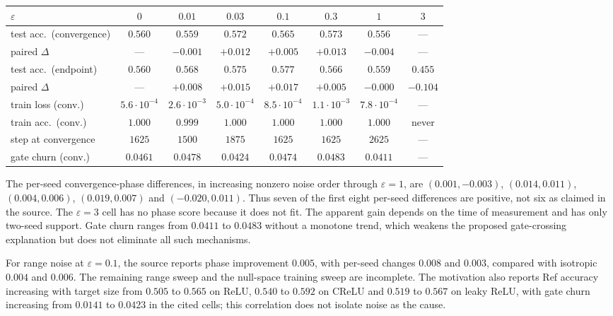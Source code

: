 \documentclass{article}
\theoremstyle{definition}
\theoremstyle{remark}
\begin{document}
\begin{center}\small
\begin{adjustbox}{max width=\linewidth}
\begin{tabular}{lccccccc}
\toprule
$\varepsilon$ & $0$ & $0.01$ & $0.03$ & $0.1$ & $0.3$ & $1$ & $3$ \\
\midrule
test acc.\ (convergence)  & $0.560$ & $0.559$ & $\mathbf{0.572}$ & $0.565$ & $\mathbf{0.573}$ & $0.556$ & --- \\
paired $\Delta$           & ---     & $-0.001$ & $+0.012$ & $+0.005$ & $+0.013$ & $-0.004$ & --- \\
\midrule
test acc.\ (endpoint)     & $0.560$ & $0.568$ & $0.575$ & $\mathbf{0.577}$ & $0.566$ & $0.559$ & $0.455$ \\
paired $\Delta$           & ---     & $+0.008$ & $+0.015$ & $\mathbf{+0.017}$ & $+0.005$ & $-0.000$ & $-0.104$ \\
\midrule
train loss (conv.)        & $5.6\cdot10^{-4}$ & $2.6\cdot10^{-3}$ & $5.0\cdot10^{-4}$
                          & $8.5\cdot10^{-4}$ & $1.1\cdot10^{-3}$ & $7.8\cdot10^{-4}$ & --- \\
train acc.\ (conv.)       & $1.000$ & $0.999$ & $1.000$ & $1.000$ & $1.000$ & $1.000$ & never \\
step at convergence       & $1625$ & $1500$ & $1875$ & $1625$ & $1625$ & $2625$ & --- \\
gate churn (conv.)        & $0.0461$ & $0.0478$ & $0.0424$ & $0.0474$ & $0.0483$ & $0.0411$ & --- \\
\bottomrule
\end{tabular}
\end{adjustbox}
\end{center}

The per-seed convergence-phase differences, in increasing nonzero noise order through $\varepsilon=1$, are $(0.001,-0.003)$, $(0.014,0.011)$, $(0.004,0.006)$, $(0.019,0.007)$ and $(-0.020,0.011)$. Thus seven of the first eight per-seed differences are positive, not six as claimed in the source. The $\varepsilon=3$ cell has no phase score because it does not fit. The apparent gain depends on the time of measurement and has only two-seed support. Gate churn ranges from $0.0411$ to $0.0483$ without a monotone trend, which weakens the proposed gate-crossing explanation but does not eliminate all such mechanisms.

For range noise at $\varepsilon=0.1$, the source reports phase improvement $0.005$, with per-seed changes $0.008$ and $0.003$, compared with isotropic $0.004$ and $0.006$. The remaining range sweep and the null-space training sweep are incomplete. The motivation also reports Ref accuracy increasing with target size from $0.505$ to $0.565$ on ReLU, $0.540$ to $0.592$ on CReLU and $0.519$ to $0.567$ on leaky ReLU, with gate churn increasing from $0.0141$ to $0.0423$ in the cited cells; this correlation does not isolate noise as the cause.
\end{document}
